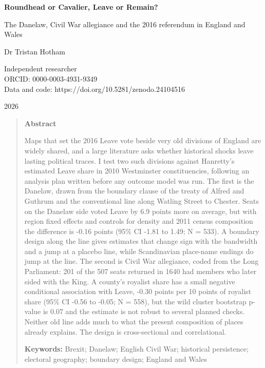 \documentclass[11pt,a4paper]{article}
\begin{document}
\begin{center}
{\Large\bfseries Roundhead or Cavalier, Leave or Remain?\par}
\vspace{0.4em}
{\large The Danelaw, Civil War allegiance and the 2016 referendum in England and Wales\par}
\vspace{1.2em}
{\large Dr Tristan Hotham\par}
\vspace{0.3em}
{\small Independent researcher\\
ORCID: 0000-0003-4931-9349\\
Data and code: https://doi.org/10.5281/zenodo.24104516\par}
\vspace{0.8em}
2026
\end{center}

\begin{quote}
\small
\begin{center}\textbf{Abstract}\end{center}
Maps that set the 2016 Leave vote beside very old divisions of England are widely shared, and a large literature asks whether historical shocks leave lasting political traces. I test two such divisions against Hanretty's estimated Leave share in 2010 Westminster constituencies, following an analysis plan written before any outcome model was run. The first is the Danelaw, drawn from the boundary clause of the treaty of Alfred and Guthrum and the conventional line along Watling Street to Chester. Seats on the Danelaw side voted Leave by 6.9 points more on average, but with region fixed effects and controls for density and 2011 census composition the difference is -0.16 points (95\% CI -1.81 to 1.49; N = 533). A boundary design along the line gives estimates that change sign with the bandwidth and a jump at a placebo line, while Scandinavian place-name endings do jump at the line. The second is Civil War allegiance, coded from the Long Parliament: 201 of the 507 seats returned in 1640 had members who later sided with the King. A county's royalist share has a small negative conditional association with Leave, -0.30 points per 10 points of royalist share (95\% CI -0.56 to -0.05; N = 558), but the wild cluster bootstrap p-value is 0.07 and the estimate is not robust to several planned checks. Neither old line adds much to what the present composition of places already explains. The design is cross-sectional and correlational.

\textbf{Keywords:} Brexit; Danelaw; English Civil War; historical persistence; electoral geography; boundary design; England and Wales
\end{quote}
\end{document}
